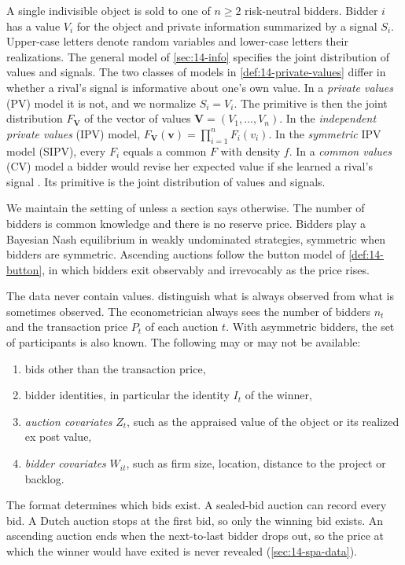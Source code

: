 A single indivisible object is sold to one of $n\ge2$ risk-neutral bidders. Bidder $i$ has a value $V_i$ for the
object and private information summarized by a signal $S_i$. Upper-case letters denote random variables and
lower-case letters their realizations. The general model of \cref{sec:14-info} specifies the joint distribution of
values and signals. The two classes of models in \cref{def:14-private-values} differ in whether a rival's signal
is informative about one's own value. In a \emph{private values} (PV) model it is not, and we normalize $S_i=V_i$.
The primitive is then the joint distribution $F_{\bm V}$ of the vector of values $\bm V=(V_1,\dots,V_n)$. In the
\emph{independent private values} (IPV) model, $F_{\bm V}(\bm v)=\prod_{i=1}^nF_i(v_i)$. In the \emph{symmetric}
IPV model (SIPV), every $F_i$ equals a common $F$ with density $f$. In a \emph{common values} (CV) model a bidder
would revise her expected value if she learned a rival's signal \citep[p.~2110]{AtheyHaile2002}. Its primitive is
the joint distribution of values and signals.

We maintain the setting of \citet[Section~2.1]{AtheyHaile2002} unless a section says otherwise. The number of
bidders is common knowledge and there is no reserve price. Bidders play a Bayesian Nash equilibrium in weakly
undominated strategies, symmetric when bidders are symmetric. Ascending auctions follow the button model of
\cref{def:14-button}, in which bidders exit observably and irrevocably as the price rises.

The data never contain values. \citet[Section~2.2]{AtheyHaile2002} distinguish what is always observed from what is
sometimes observed. The econometrician always sees the number of bidders $n_t$ and the transaction price $P_t$ of
each auction $t$. With asymmetric bidders, the set of participants is also known. The following may or may not be
available:
\begin{enumerate}[label=(\roman*)]
\item bids other than the transaction price,
\item bidder identities, in particular the identity $I_t$ of the winner,
\item \emph{auction covariates} $Z_t$, such as the appraised value of the object or its realized ex post value,
\item \emph{bidder covariates} $W_{it}$, such as firm size, location, distance to the project or backlog.
\end{enumerate}
The format determines which bids exist. A sealed-bid auction can record every bid. A Dutch auction stops at the
first bid, so only the winning bid exists. An ascending auction ends when the next-to-last bidder drops out, so the
price at which the winner would have exited is never revealed (\cref{sec:14-spa-data}).

